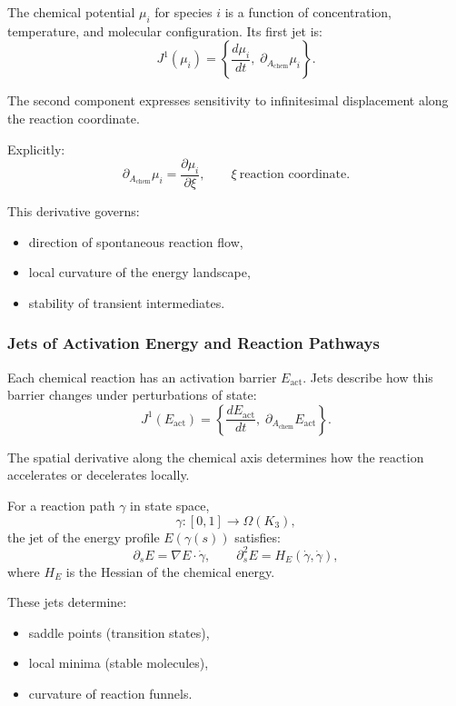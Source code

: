 The chemical potential $\mu_i$ for species $i$ is a function of
concentration, temperature, and molecular configuration. Its first jet is:
\[
J^1(\mu_i) =
\left\{
\frac{d\mu_i}{dt},\;
\partial_{A_{\mathrm{chem}}}\mu_i
\right\}.
\]

The second component expresses sensitivity to infinitesimal displacement
along the reaction coordinate.

Explicitly:
\[
\partial_{A_{\mathrm{chem}}}\mu_i
=
\frac{\partial \mu_i}{\partial \xi},
\qquad
\xi\ \text{reaction coordinate}.
\]

This derivative governs:

\begin{itemize}
    \item direction of spontaneous reaction flow,
    \item local curvature of the energy landscape,
    \item stability of transient intermediates.
\end{itemize}



\subsubsection{Jets of Activation Energy and Reaction Pathways}

Each chemical reaction has an activation barrier $E_{\mathrm{act}}$.
Jets describe how this barrier changes under perturbations of state:
\[
J^1(E_{\mathrm{act}}) =
\left\{
\frac{dE_{\mathrm{act}}}{dt},\;
\partial_{A_{\mathrm{chem}}}E_{\mathrm{act}}
\right\}.
\]

The spatial derivative along the chemical axis determines how the
reaction accelerates or decelerates locally.

For a reaction path $\gamma$ in state space,
\[
\gamma: [0,1] \to \Omega(K_3),
\]
the jet of the energy profile $E(\gamma(s))$ satisfies:
\[
\partial_s E = \nabla E \cdot \dot{\gamma},
\qquad
\partial_s^2 E = H_E(\dot{\gamma},\dot{\gamma}),
\]
where $H_E$ is the Hessian of the chemical energy.

These jets determine:

\begin{itemize}
    \item saddle points (transition states),
    \item local minima (stable molecules),
    \item curvature of reaction funnels.
\end{itemize}



